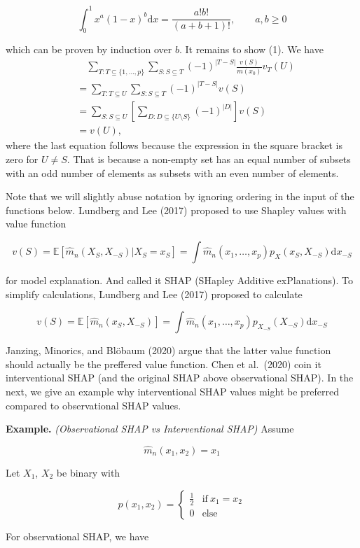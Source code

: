\documentclass[
]{book}
\begin{document}
\[
\int_0^1 x^a (1-x)^b\mathrm dx= \frac{a!b!}{(a+b+1)!}, \qquad a,b\geq0
\]

which can be proven by induction over \(b\).
It remains to show (1). We have
\begin{align}
& \quad \sum_{T: T\subseteq\{1,\dots,p\}}\sum_{S: S\subseteq T} (-1)^{|T-S|}\frac{v(S)}{m(x_0)}v_T(U) \\
&=\sum_{T: T\subseteq U}\sum_{S: S\subseteq T} (-1)^{|T-S|}v(S)\\
&= \sum_{S: S\subseteq U}\left[\sum_{D: D \subseteq \{U\setminus S\}} (-1)^{|D|} \right]v(S)\\
&= v(U),
\end{align}
where the last equation follows because the expression in the square bracket is zero for \(U\neq S\). That is because a non-empty set has an equal number of subsets with an odd number of elements as subsets with an even number of elements.

Note that we will slightly abuse notation by ignoring ordering in the input of the functions below. Lundberg and Lee (2017) proposed to use Shapley values with value function

\[
v(S)=\mathbb E[ \hat m_n(X_S,X_{-S})| X_S=x_S] = \int \hat m_n(x_1,\dots,x_p) p_X(x_S,X_{-S}) \mathrm dx_{-S}
\]

for model explanation. And called it SHAP (SHapley Additive exPlanations). To simplify calculations, Lundberg and Lee (2017) proposed to calculate

\[
v(S)= \mathbb E[\hat m_n(x_S,X_{-S})]= \int \hat m_n(x_1,\dots,x_p) p_{X_{-S}}(X_{-S}) \mathrm dx_{-S}
\]

Janzing, Minorics, and Blöbaum (2020) argue that the latter value function should actually be the preffered value function. Chen et al.~(2020) coin it interventional SHAP (and the original SHAP above observational SHAP). In the next, we give an example why interventional SHAP values might be preferred compared to observational SHAP values.

\textbf{Example.} \emph{(Observational SHAP vs Interventional SHAP)} Assume

\[
\hat m_n(x_1,x_2)=x_1
\]

Let \(X_1\), \(X_2\) be binary with

\[
p(x_1,x_2)=
\begin{cases}
\frac 1 2 & \text{if} \ x_1=x_2 \\
0 & \text{else}
\end{cases}
\]

For observational SHAP, we have
\end{document}
